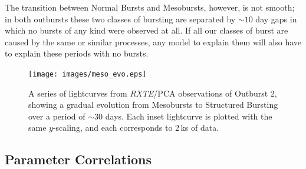 \par The transition between Normal Bursts and Mesobursts, however, is not smooth; in both outbursts these two classes of bursting are separated by $\sim10$ day gaps in which no bursts of any kind were observed at all.  If all our classes of burst are caused by the same or similar processes, any model to explain them will also have to explain these periods with no bursts.

\begin{figure}
  \centering
  \texttt{[image: images/meso\_evo.eps]}
  \caption[A series of lightcurves from \textit{RXTE}/PCA observations of Outburst 2, showing a gradual evolution from Mesobursts to Structured Bursting over a period of $\sim30$ days.]{\small A series of lightcurves from \textit{RXTE}/PCA observations of Outburst 2, showing a gradual evolution from Mesobursts to Structured Bursting over a period of $\sim30$ days.  Each inset lightcurve is plotted with the same $y$-scaling, and each corresponds to 2\,ks of data.}
  \label{fig:meso_to_struc}
\end{figure}

\subsection{Parameter Correlations}

